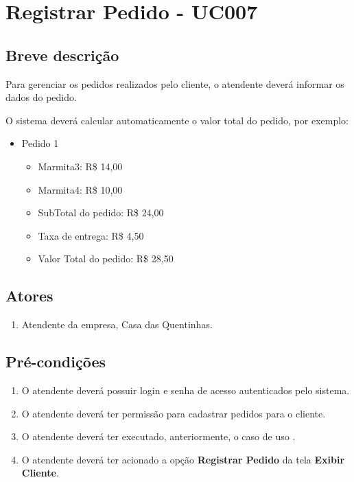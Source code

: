 \chapter{Registrar Pedido - UC007} \label{uc007}

\section{Breve descrição}

Para gerenciar os pedidos realizados pelo cliente, o atendente deverá informar os dados do pedido.

O sistema deverá calcular automaticamente o valor total do pedido, por exemplo:

\begin{itemize}
	\item Pedido 1
	\begin{itemize}
		\item Marmita3: R\$ 14,00
		\item Marmita4: R\$ 10,00
		\item SubTotal do pedido: R\$ 24,00
		\item Taxa de entrega: R\$ 4,50
		\item Valor Total do pedido: R\$ 28,50
	\end{itemize}
\end{itemize}

\section{Atores}

\begin{enumerate}
	\item Atendente da empresa, Casa das Quentinhas.
\end{enumerate}

\section{Pré-condições}

\begin{enumerate}
	\item O atendente deverá possuir login e senha de acesso autenticados pelo sistema.
	\item O atendente deverá ter permissão para cadastrar pedidos para o cliente.
	\item O atendente deverá ter executado, anteriormente, o caso de uso .
	\item O atendente deverá ter acionado a opção \textbf{Registrar Pedido} da tela \textbf{Exibir Cliente}.
\end{enumerate}

